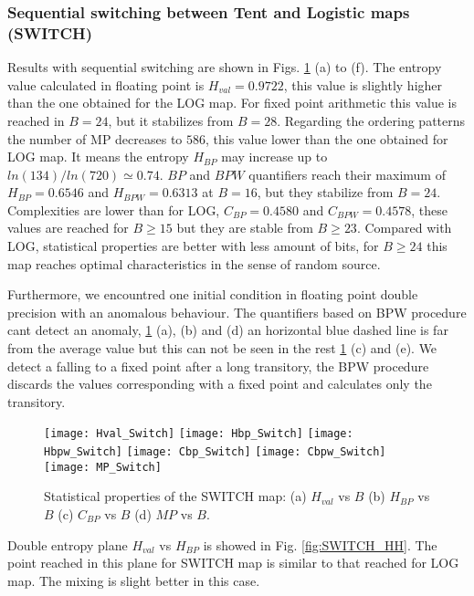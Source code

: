 \subsubsection{Sequential switching between Tent and Logistic maps (SWITCH)} \label{sssec:switch}

Results with sequential switching are shown in Figs. \ref{fig:SWITCH_QuantiB} (a) to (f).
The entropy value calculated in floating point is $H_{val}=0.9722$, this value is slightly higher than the one obtained for the LOG map. 
For fixed point arithmetic this value is reached in $B=24$, but it stabilizes from $B=28$.
Regarding the ordering patterns the number of MP decreases to $586$, this value lower than the one obtained for LOG map.
It means the entropy $H_{BP}$ may increase up to $ln(134)/ln(720)\simeq 0.74$.
$BP$ and $BPW$ quantifiers reach their maximum of $H_{BP}=0.6546$ and $H_{BPW}=0.6313$ at $B=16$, but they stabilize from $B=24$.
Complexities are lower than for LOG, $C_{BP}=0.4580$ and $C_{BPW}=0.4578$, these values are reached for $B \geq 15$ but they are stable from $B \geq 23$.
Compared with LOG, statistical properties are better with less amount of bits, for $B \geq 24$ this map reaches optimal characteristics in the sense of random source.

Furthermore, we encountred one initial condition in floating point double precision with an anomalous behaviour.
The quantifiers based on BPW procedure cant detect an anomaly, \ref{fig:SWITCH_QuantiB} (a), (b) and (d) an horizontal blue dashed line is far from the average value but this can not be seen in the rest \ref{fig:SWITCH_QuantiB} (c) and (e).
We detect a falling to a fixed point after a long transitory, the BPW procedure discards the values corresponding with a fixed point and calculates only the transitory.

\begin{figure}
	\texttt{[image: Hval\_Switch]}
	\texttt{[image: Hbp\_Switch]}
	\texttt{[image: Hbpw\_Switch]}
	\texttt{[image: Cbp\_Switch]}
	\texttt{[image: Cbpw\_Switch]}
	\texttt{[image: MP\_Switch]}
	\caption{Statistical properties of the SWITCH map: (a) $H_{val}$ vs $B$ (b) $H_{BP}$ vs $B$ (c) $C_{BP}$ vs $B$ (d) $MP$ vs $B$.}
	\label{fig:SWITCH_QuantiB}
\end{figure}

Double entropy plane $H_{val}$ vs $H_{BP}$ is showed in Fig. \ref{fig:SWITCH_HH}.
The point reached in this plane for SWITCH map is similar to that reached for LOG map.
The mixing is slight better in this case.

